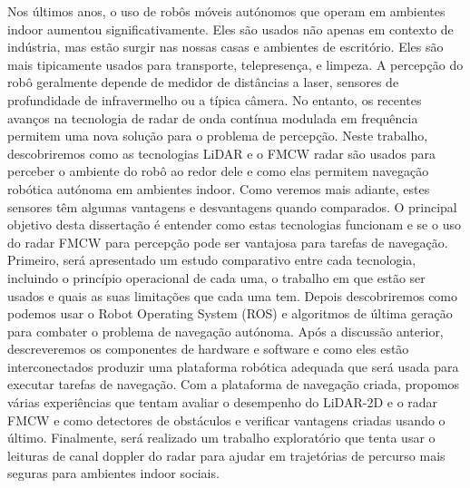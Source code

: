 \TitlePage
  \vspace*{55mm}
       {Nos últimos anos, o uso de robôs móveis autónomos que operam em ambientes indoor aumentou significativamente. Eles são usados não apenas
        em contexto de indústria, mas estão surgir nas nossas casas e ambientes de escritório. Eles são mais tipicamente usados para transporte, telepresença,
        e limpeza. A percepção do robô geralmente depende de medidor de distâncias a laser, sensores de profundidade de infravermelho ou a típica câmera. No entanto, os recentes avanços na tecnologia de radar de onda contínua modulada em frequência permitem uma nova solução para o problema de percepção. Neste trabalho, descobriremos como  as tecnologias \ac{LiDAR} e o \ac{FMCW} \ac{radar} são usados para perceber o ambiente do robô ao redor dele e como elas permitem  navegação robótica autónoma em ambientes indoor. Como veremos mais adiante, estes sensores têm algumas vantagens e desvantagens quando comparados. O principal objetivo desta dissertação é
        entender como estas tecnologias funcionam e se o uso do radar FMCW para
        percepção pode ser vantajosa para tarefas de navegação.
       }
       \TEXT{}
       { Primeiro, será apresentado um estudo comparativo entre cada tecnologia, incluindo o princípio operacional de cada uma, o trabalho em que estão ser usados e quais as suas limitações que cada uma tem. Depois descobriremos como podemos usar o Robot Operating
        System (ROS) e algoritmos de última geração para combater o problema de navegação autónoma. Após a discussão anterior, descreveremos
        os componentes de hardware e software e como eles estão interconectados
        produzir uma plataforma robótica adequada que será usada para executar tarefas de navegação.
        Com a plataforma de navegação criada, propomos várias experiências que
        tentam avaliar o desempenho do LiDAR-2D e o radar FMCW e  como
        detectores de obstáculos e verificar vantagens criadas usando o
        último. Finalmente, será realizado um trabalho exploratório que tenta usar o
        leituras de canal doppler do radar para ajudar em trajetórias de percurso mais seguras para ambientes indoor sociais.}
       \TEXT{}     
       {%
       }
 
